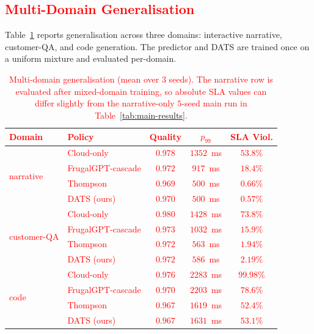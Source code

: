\documentclass[final,3p,twocolumn,authoryear]{elsarticle}
\newcommand{\rev}[1]{\textcolor{red}{#1}}
\theoremstyle{plain}
\theoremstyle{definition}
\begin{document}
\subsection{\rev{Multi-Domain Generalisation}}
\label{sec:experiments:multidomain}

Table~\ref{tab:multidomain} reports generalisation across three domains: interactive narrative, customer-QA, and code generation. The predictor and DATS are trained once on a uniform mixture and evaluated per-domain.

\rev{
\begin{table}[t]
  \centering
  \caption{Multi-domain generalisation (mean over $3$ seeds). The narrative row is evaluated after mixed-domain training, so absolute SLA values can differ slightly from the narrative-only $5$-seed main run in Table~\ref{tab:main-results}.}
  \label{tab:multidomain}
  \small
  \begin{tabular}{llccc}
    \toprule
    \textbf{Domain} & \textbf{Policy} & \textbf{Quality} & \textbf{$p_{99}$} & \textbf{SLA Viol.} \\
    \midrule
    \multirow{4}{*}{narrative}   & Cloud-only        & $0.978$ & $1352$~ms & $53.8\%$ \\
                                  & FrugalGPT-cascade & $0.972$ & $917$~ms  & $18.4\%$ \\
                                  & Thompson          & $0.969$ & $500$~ms  & $0.66\%$ \\
                                  & DATS (ours)       & $0.970$ & $500$~ms  & $\mathbf{0.57\%}$ \\
    \midrule
    \multirow{4}{*}{customer-QA} & Cloud-only        & $0.980$ & $1428$~ms & $73.8\%$ \\
                                  & FrugalGPT-cascade & $0.973$ & $1032$~ms & $15.9\%$ \\
                                  & Thompson          & $0.972$ & $563$~ms  & $1.94\%$ \\
                                  & DATS (ours)       & $0.972$ & $586$~ms  & $\mathbf{2.19\%}$ \\
    \midrule
    \multirow{4}{*}{code}        & Cloud-only        & $0.976$ & $2283$~ms & $99.98\%$ \\
                                  & FrugalGPT-cascade & $0.970$ & $2203$~ms & $78.6\%$ \\
                                  & Thompson          & $0.967$ & $1619$~ms & $\mathbf{52.4\%}$ \\
                                  & DATS (ours)       & $0.967$ & $1631$~ms & $53.1\%$ \\
    \bottomrule
  \end{tabular}
\end{table}
}
\end{document}
